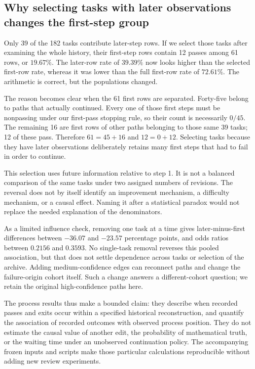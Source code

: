 \subsection{Why selecting tasks with later observations changes the first-step group}
\label{subsec:later-selection}
Only 39 of the 182 tasks contribute later-step rows. If we select those tasks after examining the whole history, their first-step rows contain 12 passes among 61 rows, or $19.67\%$. The later-row rate of $39.39\%$ now looks higher than the selected first-row rate, whereas it was lower than the full first-row rate of $72.61\%$. The arithmetic is correct, but the populations changed.

The reason becomes clear when the 61 first rows are separated. Forty-five belong to paths that actually continued. Every one of those first steps must be nonpassing under our first-pass stopping rule, so their count is necessarily $0/45$. The remaining 16 are first rows of other paths belonging to those same 39 tasks; 12 of these pass. Therefore $61=45+16$ and $12=0+12$. Selecting tasks because they have later observations deliberately retains many first steps that had to fail in order to continue.

This selection uses future information relative to step 1. It is not a balanced comparison of the same tasks under two assigned numbers of revisions. The reversal does not by itself identify an improvement mechanism, a difficulty mechanism, or a causal effect. Naming it after a statistical paradox would not replace the needed explanation of the denominators.

As a limited influence check, removing one task at a time gives later-minus-first differences between $-36.07$ and $-23.57$ percentage points, and odds ratios between $0.2156$ and $0.3593$. No single-task removal reverses this pooled association, but that does not settle dependence across tasks or selection of the archive. Adding medium-confidence edges can reconnect paths and change the failure-origin cohort itself. Such a change answers a different-cohort question; we retain the original high-confidence paths here.

The process results thus make a bounded claim: they describe when recorded passes and exits occur within a specified historical reconstruction, and quantify the association of recorded outcomes with observed process position. They do not estimate the causal value of another edit, the probability of mathematical truth, or the waiting time under an unobserved continuation policy. The accompanying frozen inputs and scripts make those particular calculations reproducible without adding new review experiments.
